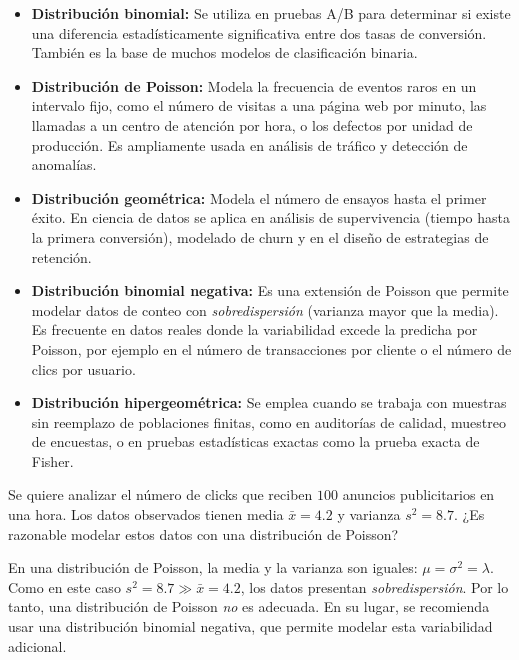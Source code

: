 \begin{itemize}
 \item \textbf{Distribución binomial:} Se utiliza en pruebas A/B para determinar si existe una diferencia estadísticamente significativa entre dos tasas de conversión. También es la base de muchos modelos de clasificación binaria.

 \item \textbf{Distribución de Poisson:} Modela la frecuencia de eventos raros en un intervalo fijo, como el número de visitas a una página web por minuto, las llamadas a un centro de atención por hora, o los defectos por unidad de producción. Es ampliamente usada en análisis de tráfico y detección de anomalías.

 \item \textbf{Distribución geométrica:} Modela el número de ensayos hasta el primer éxito. En ciencia de datos se aplica en análisis de supervivencia (tiempo hasta la primera conversión), modelado de churn y en el diseño de estrategias de retención.

 \item \textbf{Distribución binomial negativa:} Es una extensión de Poisson que permite modelar datos de conteo con \emph{sobredispersión} (varianza mayor que la media). Es frecuente en datos reales donde la variabilidad excede la predicha por Poisson, por ejemplo en el número de transacciones por cliente o el número de clics por usuario.

 \item \textbf{Distribución hipergeométrica:} Se emplea cuando se trabaja con muestras sin reemplazo de poblaciones finitas, como en auditorías de calidad, muestreo de encuestas, o en pruebas estadísticas exactas como la prueba exacta de Fisher.
\end{itemize}

\begin{ejemplo}
 \label{exmp:2.10.18}
 Se quiere analizar el número de clicks que reciben $100$ anuncios publicitarios en una hora. Los datos observados tienen media $\bar{x}=4.2$ y varianza $s^{2}=8.7$. ¿Es razonable modelar estos datos con una distribución de Poisson?
\end{ejemplo}

\begin{solucion}
	En una distribución de Poisson, la media y la varianza son iguales: $\mu = \sigma^{2} = \lambda$. Como en este caso $s^{2} = 8.7 \gg \bar{x} = 4.2$, los datos presentan \emph{sobredispersión}. Por lo tanto, una distribución de Poisson \emph{no} es adecuada. En su lugar, se recomienda usar una distribución binomial negativa, que permite modelar esta variabilidad adicional.
\end{solucion}

